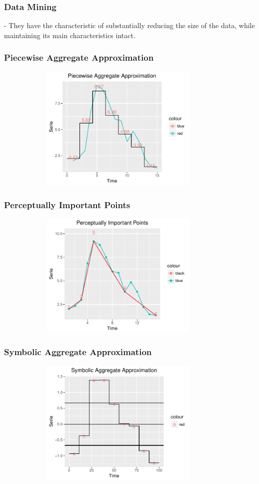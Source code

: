\documentclass[10pt, compress]{beamer}
\begin{document}
\begin{frame}[fragile]
\frametitle{Data Mining}

- They have the characteristic of substantially reducing the size of the data, while maintaining its main characteristics intact.
\end{frame}

\begin{frame}[fragile]
\frametitle{Piecewise Aggregate Approximation}
\begin{figure}
  \centering
   \includegraphics[width=10cm,height=6cm]{PAA.pdf}
\end{figure}
\end{frame}

\begin{frame}[fragile]
\frametitle{Perceptually Important Points}
\begin{figure}
  \centering
   \includegraphics[width=10cm,height=6cm]{PIP.pdf}
\end{figure}
\end{frame}

\begin{frame}[fragile]
\frametitle{Symbolic Aggregate Approximation}
\begin{figure}
  \centering
   \includegraphics[width=10cm,height=6cm]{SAX.pdf}
\end{figure}
\end{frame}
\end{document}
